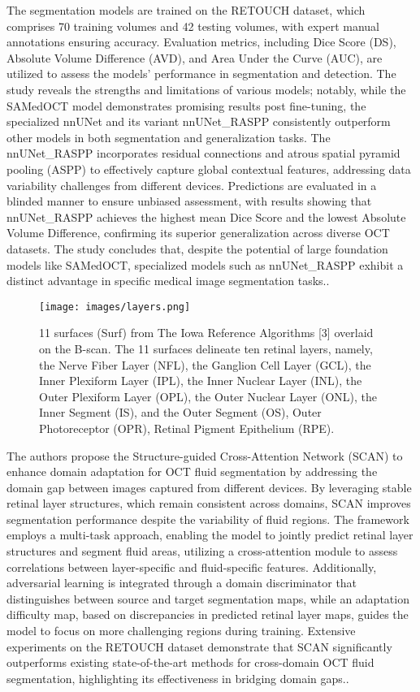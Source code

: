 \documentclass{article}
\begin{document}
The segmentation models are trained on the RETOUCH dataset, which comprises 70 training volumes and 42 testing volumes, with expert manual annotations ensuring accuracy. Evaluation metrics, including Dice Score (DS), Absolute Volume Difference (AVD), and Area Under the Curve (AUC), are utilized to assess the models' performance in segmentation and detection. The study reveals the strengths and limitations of various models; notably, while the SAMedOCT model demonstrates promising results post fine-tuning, the specialized nnUNet and its variant nnUNet\_RASPP consistently outperform other models in both segmentation and generalization tasks. The nnUNet\_RASPP incorporates residual connections and atrous spatial pyramid pooling (ASPP) to effectively capture global contextual features, addressing data variability challenges from different devices. Predictions are evaluated in a blinded manner to ensure unbiased assessment, with results showing that nnUNet\_RASPP achieves the highest mean Dice Score and the lowest Absolute Volume Difference, confirming its superior generalization across diverse OCT datasets. The study concludes that, despite the potential of large foundation models like SAMedOCT, specialized models such as nnUNet\_RASPP exhibit a distinct advantage in specific medical image segmentation tasks.\cite{ndipeno2021performance}.

\begin{figure}[h!]
    \centering
    \texttt{[image: images/layers.png]}
    \caption{ 11 surfaces (Surf) from The Iowa Reference Algorithms [3] overlaid on
 the B-scan. The 11 surfaces delineate ten retinal layers, namely, the Nerve
 Fiber Layer (NFL), the Ganglion Cell Layer (GCL), the Inner Plexiform Layer
 (IPL), the Inner Nuclear Layer (INL), the Outer Plexiform Layer (OPL),
 the Outer Nuclear Layer (ONL), the Inner Segment (IS), and the Outer
 Segment (OS), Outer Photoreceptor (OPR), Retinal Pigment
 Epithelium (RPE).}
    \label{Retinal Fluid Layers}
\end{figure}

The authors propose the Structure-guided Cross-Attention Network (SCAN) to enhance domain adaptation for OCT fluid segmentation by addressing the domain gap between images captured from different devices. By leveraging stable retinal layer structures, which remain consistent across domains, SCAN improves segmentation performance despite the variability of fluid regions. The framework employs a multi-task approach, enabling the model to jointly predict retinal layer structures and segment fluid areas, utilizing a cross-attention module to assess correlations between layer-specific and \newpage fluid-specific features. Additionally, adversarial learning is integrated through a domain discriminator that distinguishes between source and target segmentation maps, while an adaptation difficulty map, based on discrepancies in predicted retinal layer maps, guides the model to focus on more challenging regions during training. Extensive experiments on the RETOUCH dataset demonstrate that SCAN significantly outperforms existing state-of-the-art methods for cross-domain OCT fluid segmentation, highlighting its effectiveness in bridging domain gaps.\cite{he2021structure}.
\end{document}
